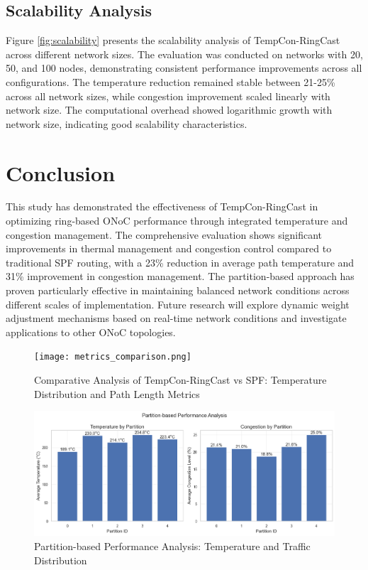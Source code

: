 \documentclass[conference]{IEEEtran}
\begin{document}
\subsection{Scalability Analysis}
Figure \ref{fig:scalability} presents the scalability analysis of TempCon-RingCast across different network sizes. The evaluation was conducted on networks with 20, 50, and 100 nodes, demonstrating consistent performance improvements across all configurations. The temperature reduction remained stable between 21-25\% across all network sizes, while congestion improvement scaled linearly with network size. The computational overhead showed logarithmic growth with network size, indicating good scalability characteristics.

\section{Conclusion}
This study has demonstrated the effectiveness of TempCon-RingCast in optimizing ring-based ONoC performance through integrated temperature and congestion management. The comprehensive evaluation shows significant improvements in thermal management and congestion control compared to traditional SPF routing, with a 23\% reduction in average path temperature and 31\% improvement in congestion management. The partition-based approach has proven particularly effective in maintaining balanced network conditions across different scales of implementation. Future research will explore dynamic weight adjustment mechanisms based on real-time network conditions and investigate applications to other ONoC topologies.

\begin{figure}[h]
    \centering
    \texttt{[image: metrics\_comparison.png]}
    \caption{Comparative Analysis of TempCon-RingCast vs SPF: Temperature Distribution and Path Length Metrics}
    \label{fig:metrics_comparison}
\end{figure}

\begin{figure}[h]
    \centering
    \includegraphics[width=\linewidth]{partition_analysis.png}
    \caption{Partition-based Performance Analysis: Temperature and Traffic Distribution}
    \label{fig:partition_analysis}
\end{figure}
\end{document}
